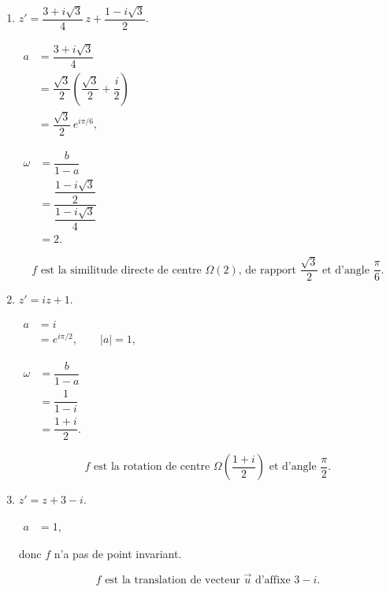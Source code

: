 \documentclass[12pt,a4paper]{article}
\begin{document}
\begin{enumerate}
    \[
    \boxed{f \text{ est la symétrie centrale (homothétie de rapport } -1\text{) de centre } \Omega(i).}
    \]

    \item $z' = \dfrac{3 + i\sqrt3}{4}\,z + \dfrac{1 - i\sqrt3}{2}$.

    $
    \begin{aligned}
    a &= \dfrac{3 + i\sqrt3}{4} \\[1mm]
      &= \dfrac{\sqrt3}{2}\left(\dfrac{\sqrt3}{2}+\dfrac{i}{2}\right) \\[1mm]
      &= \dfrac{\sqrt3}{2}\,e^{i\pi/6},
    \end{aligned}
    $

    $
    \begin{aligned}
    \omega &= \dfrac{b}{1-a} \\[1mm]
           &= \dfrac{\dfrac{1 - i\sqrt3}{2}}{\dfrac{1 - i\sqrt3}{4}} \\[1mm]
           &= 2.
    \end{aligned}
    $

    \[
    \boxed{f \text{ est la similitude directe de centre } \Omega(2) \text{, de rapport } \dfrac{\sqrt3}{2} \text{ et d'angle } \dfrac{\pi}{6}.}
    \]

    \item $z' = iz + 1$.

    $
    \begin{aligned}
    a &= i \\[1mm]
      &= e^{i\pi/2}, \qquad |a| = 1,
    \end{aligned}
    $

    $
    \begin{aligned}
    \omega &= \dfrac{b}{1-a} \\[1mm]
           &= \dfrac{1}{1-i} \\[1mm]
           &= \dfrac{1+i}{2}.
    \end{aligned}
    $

    \[
    \boxed{f \text{ est la rotation de centre } \Omega\left(\dfrac{1+i}{2}\right) \text{ et d'angle } \dfrac{\pi}{2}.}
    \]

    \item $z' = z + 3 - i$.

    $
    \begin{aligned}
    a &= 1,
    \end{aligned}
    $

    donc $f$ n'a pas de point invariant.

    \[
    \boxed{f \text{ est la translation de vecteur } \vec{u} \text{ d'affixe } 3 - i.}
    \]

\end{enumerate}
\end{document}
